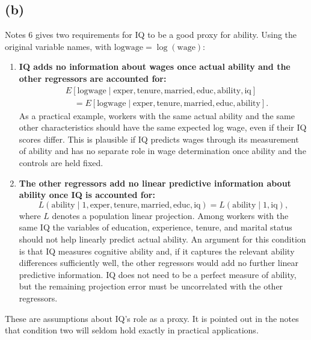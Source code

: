 \documentclass[11pt]{article}
\begin{document}
\subsection{(b)}
Notes 6 gives two requirements for IQ to be a good proxy for ability.
Using the original variable names, with $\text{logwage}=\log(\text{wage})$:
\begin{enumerate}
\item \textbf{IQ adds no information about wages once actual ability
and the other regressors are accounted for:}
\[
\begin{aligned}
&E[\text{logwage}\mid\text{exper},\text{tenure},\text{married},
   \text{educ},\text{ability},\text{iq}]\\
&\quad=E[\text{logwage}\mid\text{exper},\text{tenure},\text{married},
   \text{educ},\text{ability}].
\end{aligned}
\]
As a practical example, workers with the same actual ability and the same
other characteristics should have the same expected log wage, even if
their IQ scores differ. This is plausible if IQ predicts wages through
its measurement of ability and has no separate role in wage
determination once ability and the controls are held fixed.

\item \textbf{The other regressors add no linear predictive information
about ability once IQ is accounted for:}
\[
L(\text{ability}\mid 1,\text{exper},\text{tenure},\text{married},
  \text{educ},\text{iq})
=L(\text{ability}\mid 1,\text{iq}),
\]
where $L$ denotes a population linear projection. Among workers with
the same IQ the variables of education, experience, tenure, and marital status should
not help linearly predict actual ability. An argument for this
condition is that IQ measures cognitive ability and, if it captures
the relevant ability differences sufficiently well, the other
regressors would add no further linear predictive information.
IQ does not need to be a perfect measure of ability, but the remaining projection
error must be uncorrelated with the other regressors.
\end{enumerate}
These are assumptions about IQ's role as a proxy. It is pointed out in the notes that condition two will seldom hold exactly in practical applications.
\end{document}
